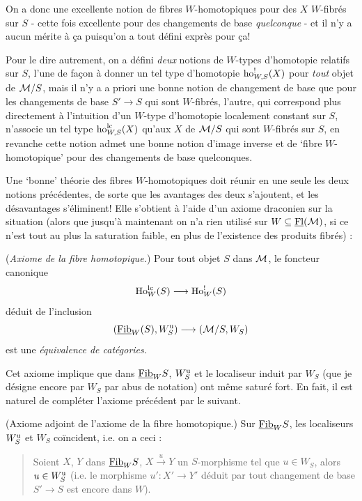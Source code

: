 
On a donc une excellente notion de fibres $W$-homotopiques pour des $X$ $W$-fibrés sur $S$ - cette fois excellente pour des changements de base \textit{quelconque} - et il n'y a aucun mérite à ça puisqu'on a tout défini exprès pour ça! %

Pour le dire autrement, on a défini \textit{deux} notions de $W$-types d'homotopie relatifs sur $S$, l'une de façon à donner un tel type d'homotopie $\mathrm{ho}^!_{W,S}(X)$ pour \textit{tout} objet de $\mathcal{M}/S$, mais il n'y a a priori une bonne notion de changement de base que pour les changements de base $S' \longrightarrow S$ qui sont $W$-fibrés, l'autre, qui correspond plus directement à l'intuition d'un $W$-type d'homotopie localement constant sur $S$, n'associe un tel type $\mathrm{ho}^{\mathrm{lc}}_{W,S}(X)$ qu'aux $X$ de $\mathcal{M}/S$ qui sont $W$-fibrés sur $S$, en revanche cette notion admet une bonne notion d'image inverse et de ‘fibre $W$-homotopique’ pour des changements de base quelconques.

Une ‘bonne’ théorie des fibres $W$-homotopiques doit réunir en une seule les deux notions précédentes, de sorte que les avantages des deux s'ajoutent, et les désavantages s'éliminent! Elle s'obtient à l'aide d'un axiome draconien sur la situation (alors que jusqu'à maintenant on n'a rien utilisé sur $W \subseteq \underline{\mathrm{Fl}}(\mathcal{M})$, si ce n'est tout au plus la saturation faible, en plus de l'existence des produits fibrés) :

 (\textit{Axiome de la fibre homotopique.}) Pour tout objet $S$ dans $\mathcal{M}$, le foncteur canonique
\[
\mathrm{Ho}^{\mathrm{lc}}_W(S) \longrightarrow \mathrm{Ho}^!_W(S)
\]
déduit de l'inclusion
\[
(\underline{\mathrm{Fib}}_W(S), W^{\mathrm{u}}_S) \longrightarrow (\mathcal{M}/S, W_S)
\]
est une \textit{équivalence de catégories.}

Cet axiome implique que dans $\underline{\mathrm{Fib}}_W S$, $W^{\mathrm{u}}_S$ et le localiseur induit par $W_S$ (que je désigne encore par $W_S$ par abus de notation) ont même saturé fort. En fait, il est naturel de compléter l'axiome précédent par le suivant.

 (Axiome adjoint de l'axiome de la fibre homotopique.) Sur $\underline{\mathrm{Fib}}_W S$, les localiseurs $W^{\mathrm{u}}_S$ et $W_S$ coïncident, i.e. on a ceci :

\begin{quote}
Soient $X$, $Y$ dans $\underline{\mathrm{Fib}}_W S$, $X \xrightarrow{u} Y$ un $S$-morphisme tel que $u \in W_S$, alors $u \in W^{\mathrm{u}}_S$ (i.e. le morphisme $u' : X' \longrightarrow Y'$ déduit par tout changement de base $S' \longrightarrow S$ est encore dans $W$).
\end{quote}

